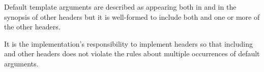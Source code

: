 \pnum
Default template arguments are described as appearing both in 
and in the synopsis of other headers but it is well-formed to include both
 and one or more of the other headers.
\begin{note} It is the implementation's responsibility to implement headers so
that including  and other headers does not violate the rules
about multiple occurrences of default arguments. \end{note}



